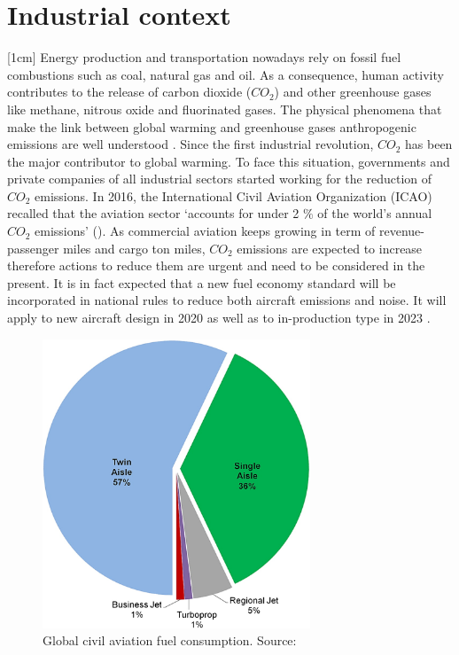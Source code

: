 \section*{Industrial context}
[1cm] 
Energy production and transportation nowadays rely on fossil fuel combustions such as coal, natural gas and oil. As a consequence, human activity contributes to the release of carbon dioxide ($CO_2$) and other greenhouse gases like methane, nitrous oxide and fluorinated gases. The physical phenomena that make the link between global warming and greenhouse gases anthropogenic emissions are well understood \cite{change2007physical}. Since the first industrial revolution, $CO_2$ has been the major contributor to global warming.
To face this situation, governments and private companies of all industrial sectors started working for the reduction of $CO_2$ emissions.
In 2016, the International Civil Aviation
Organization (ICAO) recalled that the aviation sector ‘accounts for under 2 $\%$ of the world’s annual $CO_2$ emissions' (\cite{icao2016environmental}). 
As commercial aviation keeps growing in term of revenue-passenger miles and cargo ton miles, $CO_2$ emissions are expected to increase \cite{terrenoire2019contribution} therefore actions to reduce them are urgent and need to be considered in the present. It is in fact expected that a new fuel economy standard will be incorporated in national rules to reduce both aircraft emissions and noise.
It will apply to new aircraft design in 2020 as well as to in-production type in 2023 \cite{national2016commercial}.\\
\begin{figure}[ht]
\centering
\includegraphics[width=8cm]{images/intro/figure2}
\caption{Global civil aviation fuel consumption. Source: \cite{yutko2011approaches,epstein2019considerations}}
\label{fig.intro1}
\end{figure}
